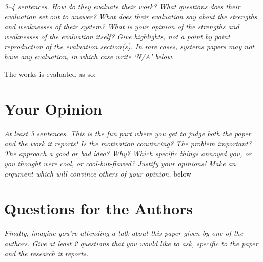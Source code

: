 \documentclass[11pt]{article}
\begin{document}
\textsl{3--4 sentences. How do they evaluate their work? What questions does
their evaluation set out to answer? What does their evaluation say about the
strengths and weaknesses of their system? What is your opinion of the strengths
and weaknesses of the evaluation itself? Give highlights, not a point by point
reproduction of the evaluation section(s). In rare cases, systems papers may
not have any evaluation, in which case write `N/A' below.}

The works is evaluated as so:


\section*{Your Opinion}

\textsl{At least 3 sentences. This is the fun part where you get to judge both
the paper and the work it reports! Is the motivation convincing? The problem
important? The approach a good or bad idea? Why? Which specific things annoyed
you, or you thought were cool, or cool-but-flawed? Justify your opinions! Make
an argument which will convince others of your opinion.}
below


\section*{Questions for the Authors}

\textsl{Finally, imagine you're attending a talk about this paper given by one
of the authors. Give at least 2 questions that you would like to ask, specific
to the paper and the research it reports.}




\end{document}
